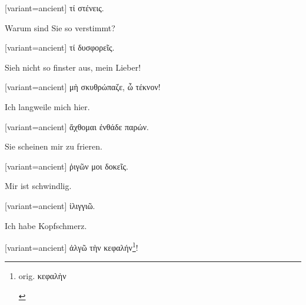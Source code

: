 \switchcolumn

\begin{greek}[variant=ancient]%
τί στένεις.

\end{greek}%
\switchcolumn*

Warum sind Sie so verstimmt?

\switchcolumn

\begin{greek}[variant=ancient]%
τί δυσφορεῖς.

\end{greek}%
\switchcolumn*

Sieh nicht so finster aus, mein Lieber!

\switchcolumn

\begin{greek}[variant=ancient]%
μὴ σκυθρώπαζε, ὦ τέκνον!

\end{greek}%
\switchcolumn*

Ich langweile mich hier.

\switchcolumn

\begin{greek}[variant=ancient]%
ἄχθομαι ἐνθάδε παρών.

\end{greek}%
\switchcolumn*

Sie scheinen mir zu frieren.

\switchcolumn

\begin{greek}[variant=ancient]%
ῥιγῶν μοι δοκεῖς.

\end{greek}%
\switchcolumn*

Mir ist schwindlig.

\switchcolumn

\begin{greek}[variant=ancient]%
ἰλιγγιῶ.

\end{greek}%
\switchcolumn*

Ich habe Kopf\textcompwordmark{}schmerz.

\switchcolumn

\begin{greek}[variant=ancient]%
ἀλγῶ τὴν κεφαλήν\footnote{\begin{latin}%
orig. \textgreek[variant=ancient]{κεφαλὴν}\end{latin}%
}!

\end{greek}%
\switchcolumn*

